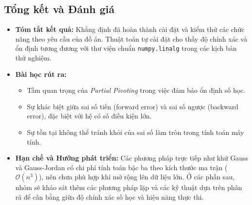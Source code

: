 \subsection{Tổng kết và Đánh giá}
\begin{itemize}
    \item \textbf{Tóm tắt kết quả:} Khẳng định đã hoàn thành cài đặt và kiểm thử các chức năng theo yêu cầu của đồ án. Thuật toán tự cài đặt cho thấy độ chính xác và ổn định tương đương với thư viện chuẩn \texttt{numpy.linalg} trong các kịch bản thử nghiệm.
    \item \textbf{Bài học rút ra:}
    \begin{itemize}
        \item Tầm quan trọng của \textit{Partial Pivoting} trong việc đảm bảo ổn định số học.
        \item Sự khác biệt giữa sai số tiến (forward error) và sai số ngược (backward error), đặc biệt với hệ có số điều kiện lớn.
        \item Sự tồn tại không thể tránh khỏi của sai số làm tròn trong tính toán máy tính.
    \end{itemize}
    \item \textbf{Hạn chế và Hướng phát triển:} Các phương pháp trực tiếp như khử Gauss và Gauss-Jordan có chi phí tính toán bậc ba theo kích thước ma trận ($\mathcal{O}(n^3)$), nên chưa phù hợp khi mở rộng lên dữ liệu lớn. Ở các phần sau, nhóm sẽ khảo sát thêm các phương pháp lặp và các kỹ thuật dựa trên phân rã để cân bằng giữa độ chính xác số học và hiệu năng thực thi.
\end{itemize}